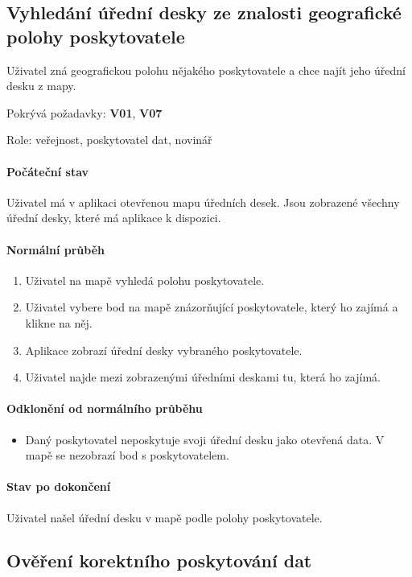 \subsection{Vyhledání úřední desky ze znalosti geografické polohy poskytovatele}
\label{use-case:mapa}

Uživatel zná geografickou polohu nějakého poskytovatele a chce najít jeho úřední desku z mapy.

Pokrývá požadavky: \textbf{V01}, \textbf{V07}

Role: veřejnost, poskytovatel dat, novinář

\paragraph{Počáteční stav} 
Uživatel má v aplikaci otevřenou mapu úředních desek. Jsou zobrazené všechny úřední desky, které má aplikace k dispozici.

\paragraph{Normální průběh}
\begin{enumerate}
    \item Uživatel na mapě vyhledá polohu poskytovatele.
    \item Uživatel vybere bod na mapě znázorňující poskytovatele, který ho zajímá a klikne na něj.
    \item Aplikace zobrazí úřední desky vybraného poskytovatele.
    \item Uživatel najde mezi zobrazenými úředními deskami tu, která ho zajímá.
\end{enumerate}

\paragraph{Odklonění od normálního průběhu}
\begin{itemize}
    \item Daný poskytovatel neposkytuje svoji úřední desku jako otevřená data. V mapě se nezobrazí bod s poskytovatelem.
\end{itemize}

\paragraph{Stav po dokončení}
Uživatel našel úřední desku v mapě podle polohy poskytovatele.

\subsection{Ověření korektního poskytování dat} \label{use-case:validace}

